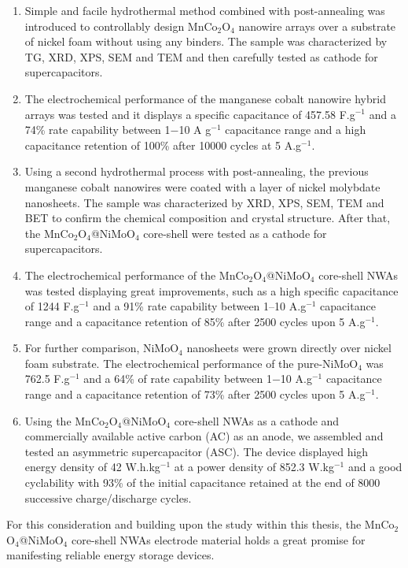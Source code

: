 \documentclass[reprint,amsmath,amssymb,aps,floatfix,
]{revtex4-2}
\begin{document}
\begin{enumerate}
    \item Simple and facile hydrothermal method combined with post-annealing was introduced to controllably design MnCo$_2$O$_4$ nanowire arrays over a substrate of nickel foam without using any binders. The sample was characterized by TG, XRD, XPS, SEM and TEM and then carefully tested as cathode for supercapacitors.
    \item The electrochemical performance of the manganese cobalt nanowire hybrid arrays was tested and it displays a specific capacitance of 457.58 F.g$^{-1}$ and a 74\% rate capability between 1$-$10 A g$^{-1}$ capacitance range and a high capacitance retention of 100\% after 10000 cycles at 5 A.g$^{-1}$.
    \item Using a second hydrothermal process with post-annealing, the previous manganese cobalt nanowires were coated with a layer of nickel molybdate nanosheets. The sample was characterized by XRD, XPS, SEM, TEM and BET to confirm the chemical composition and crystal structure. After that, the MnCo$_2$O$_4$@NiMoO$_4$ core-shell were tested as a cathode for supercapacitors.
    \item The electrochemical performance of the MnCo$_2$O$_4$@NiMoO$_4$ core-shell NWAs was tested displaying great improvements, such as a high specific capacitance of 1244 F.g$^{-1}$ and  a 91\% rate capability between 1$–$10 A.g$^{-1}$ capacitance range and a capacitance retention of 85\% after 2500 cycles upon 5 A.g$^{-1}$.
    \item For further comparison, NiMoO$_4$ nanosheets were grown directly over nickel foam substrate. The electrochemical performance of the pure-NiMoO$_4$ was 762.5 F.g$^{-1}$ and a 64\% of rate capability between 1$-$10 A.g$^{-1}$ capacitance range and a capacitance retention of 73\% after 2500 cycles upon 5 A.g$^{-1}$.
    \item Using the MnCo$_2$O$_4$@NiMoO$_4$ core-shell NWAs as a cathode and commercially available active carbon (AC) as an anode, we assembled and tested an asymmetric supercapacitor (ASC). The device displayed high energy density of 42 W.h.kg$^{-1}$ at a power density of 852.3  W.kg$^{-1}$ and a good cyclability with 93\% of the initial capacitance retained at the end of 8000 successive charge/discharge cycles. 
\end{enumerate}
For this consideration and building upon the study within this thesis, the  MnCo$_2$O$_4$@NiMoO$_4$ core-shell NWAs electrode material holds a great promise for manifesting reliable energy storage devices.
\newpage
\twocolumngrid
\end{document}
